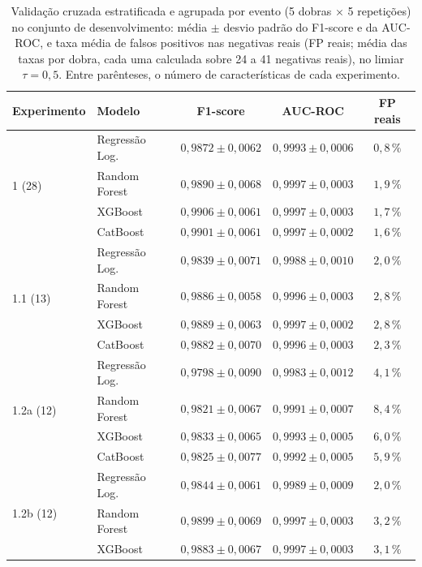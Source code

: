 \begin{table}[htbp]
\centering
\caption{Validação cruzada estratificada e agrupada por evento (5 dobras $\times$ 5 repetições) no conjunto de desenvolvimento: média $\pm$ desvio padrão do F1-score e da AUC-ROC, e taxa média de falsos positivos nas negativas reais (FP reais; média das taxas por dobra, cada uma calculada sobre 24 a 41 negativas reais), no limiar $\tau = 0{,}5$. Entre parênteses, o número de características de cada experimento.}
\label{tab:cv_configs}
\footnotesize
\begin{tabular}{llccc}
\hline
\textbf{Experimento} & \textbf{Modelo} & \textbf{F1-score} & \textbf{AUC-ROC} & \textbf{FP reais} \\
\hline
\multirow{4}{*}{1 (28)} & Regressão Log. & $0{,}9872 \pm 0{,}0062$ & $0{,}9993 \pm 0{,}0006$ & $0{,}8\,\%$ \\
 & Random Forest & $0{,}9890 \pm 0{,}0068$ & $0{,}9997 \pm 0{,}0003$ & $1{,}9\,\%$ \\
 & XGBoost & $0{,}9906 \pm 0{,}0061$ & $0{,}9997 \pm 0{,}0003$ & $1{,}7\,\%$ \\
 & CatBoost & $0{,}9901 \pm 0{,}0061$ & $0{,}9997 \pm 0{,}0002$ & $1{,}6\,\%$ \\
\hline
\multirow{4}{*}{1.1 (13)} & Regressão Log. & $0{,}9839 \pm 0{,}0071$ & $0{,}9988 \pm 0{,}0010$ & $2{,}0\,\%$ \\
 & Random Forest & $0{,}9886 \pm 0{,}0058$ & $0{,}9996 \pm 0{,}0003$ & $2{,}8\,\%$ \\
 & XGBoost & $0{,}9889 \pm 0{,}0063$ & $0{,}9997 \pm 0{,}0002$ & $2{,}8\,\%$ \\
 & CatBoost & $0{,}9882 \pm 0{,}0070$ & $0{,}9996 \pm 0{,}0003$ & $2{,}3\,\%$ \\
\hline
\multirow{4}{*}{1.2a (12)} & Regressão Log. & $0{,}9798 \pm 0{,}0090$ & $0{,}9983 \pm 0{,}0012$ & $4{,}1\,\%$ \\
 & Random Forest & $0{,}9821 \pm 0{,}0067$ & $0{,}9991 \pm 0{,}0007$ & $8{,}4\,\%$ \\
 & XGBoost & $0{,}9833 \pm 0{,}0065$ & $0{,}9993 \pm 0{,}0005$ & $6{,}0\,\%$ \\
 & CatBoost & $0{,}9825 \pm 0{,}0077$ & $0{,}9992 \pm 0{,}0005$ & $5{,}9\,\%$ \\
\hline
\multirow{4}{*}{1.2b (12)} & Regressão Log. & $0{,}9844 \pm 0{,}0061$ & $0{,}9989 \pm 0{,}0009$ & $2{,}0\,\%$ \\
 & Random Forest & $0{,}9899 \pm 0{,}0069$ & $0{,}9997 \pm 0{,}0003$ & $3{,}2\,\%$ \\
 & XGBoost & $0{,}9883 \pm 0{,}0067$ & $0{,}9997 \pm 0{,}0003$ & $3{,}1\,\%$ \\

\end{tabular}
\end{table}
